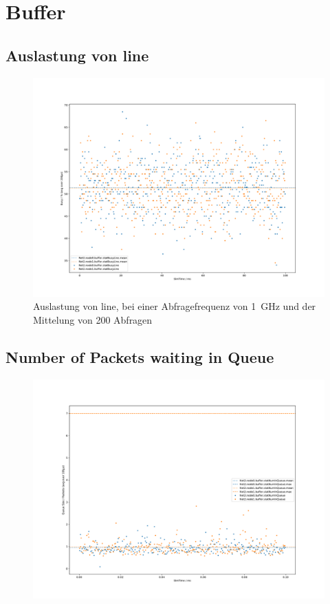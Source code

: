 \documentclass[]{scrartcl}
\begin{document}
\section{Buffer}
\subsection{Auslastung von line}
\begin{figure}[ht]
    \centering
    \includegraphics[width=\columnwidth]{../../python/03_01.pdf}
    \caption{Auslastung von line, bei einer Abfragefrequenz von \SI{1}{GHz} und der Mittelung von 200 Abfragen}
\end{figure}
\newpage
\subsection{Number of Packets waiting in Queue}
\begin{figure}[ht]
    \centering
    \includegraphics[width=\columnwidth]{../../python/03_02.pdf}
    \caption{}
\end{figure}
\end{document}
